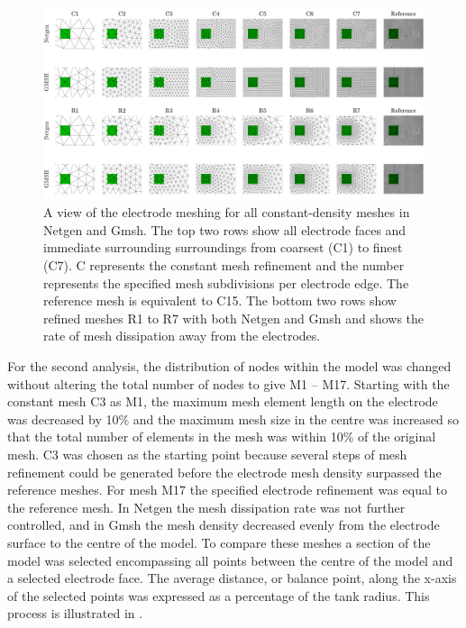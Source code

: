 \begin{figure}
  \includegraphics[width=\textwidth]{chapter4-mesh_refinement/imgs/electrode_mesh_size_large.pdf}
  \caption[Mesh size surrounding the electrode]{\label{fig:electrode_mesh_size} A view of the electrode meshing for all constant-density meshes 
  in Netgen and Gmsh. The top two rows show all electrode faces and immediate surrounding
  surroundings from coarsest (C1) to finest (C7). C represents the constant mesh refinement and the number
  represents the specified mesh subdivisions per electrode edge. The reference mesh is equivalent to C15.
  The bottom two rows show refined meshes R1 to R7 with both Netgen and Gmsh and shows the rate of mesh
  dissipation away from the electrodes.}
\end{figure}

For the second analysis, the distribution of nodes within the 
model was changed without altering 
the total number of nodes to give M1 -- M17. 
Starting with the constant mesh C3 as M1, the maximum mesh element 
length on the electrode was decreased by 10\% and the maximum mesh size in the centre was
increased so that the total number of elements in the mesh was  within 10\% of the 
original mesh. C3 was chosen as the starting point because several steps of mesh 
refinement could be generated before the electrode mesh density surpassed the reference meshes. 
For mesh M17 the specified electrode refinement was equal to the reference mesh. 
In Netgen the mesh dissipation rate was not further controlled, and in Gmsh the mesh density 
decreased evenly from the electrode surface to the centre of the model. 
To compare these meshes a section of the model was selected
encompassing all points between the centre of the model and a selected electrode face.
The average 
distance, or balance point, along the x-axis of the selected points was expressed 
as a percentage of the tank radius.
This process is illustrated in .
 
